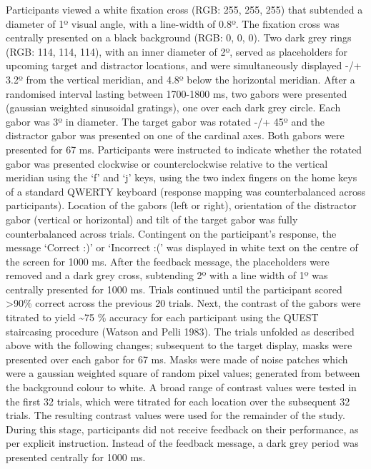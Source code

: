 \documentclass[11pt,halfline,a4paper,]{ouparticle}
\begin{document}
Participants viewed a white fixation cross (RGB: 255, 255, 255) that subtended a diameter of 1º visual angle, with a line-width of 0.8º. The fixation cross was centrally presented on a black background (RGB: 0, 0, 0). Two dark grey rings (RGB: 114, 114, 114), with an inner diameter of 2º, served as placeholders for upcoming target and distractor locations, and were simultaneously displayed -/+ 3.2º from the vertical meridian, and 4.8º below the horizontal meridian. After a randomised interval lasting between 1700-1800 ms, two gabors were presented (gaussian weighted sinusoidal gratings), one over each dark grey circle. Each gabor was 3º in diameter. The target gabor was rotated -/+ 45º and the distractor gabor was presented on one of the cardinal axes. Both gabors were presented for 67 ms. Participants were instructed to indicate whether the rotated gabor was presented clockwise or counterclockwise relative to the vertical meridian using the `f' and `j' keys, using the two index fingers on the home keys of a standard QWERTY keyboard (response mapping was counterbalanced across participants). Location of the gabors (left or right), orientation of the distractor gabor (vertical or horizontal) and tilt of the target gabor was fully counterbalanced across trials. Contingent on the participant's response, the message `Correct :)' or `Incorrect :(' was displayed in white text on the centre of the screen for 1000 ms. After the feedback message, the placeholders were removed and a dark grey cross, subtending 2º with a line width of 1º was centrally presented for 1000 ms. Trials continued until the participant scored \textgreater90\% correct across the previous 20 trials. Next, the contrast of the gabors were titrated to yield \textasciitilde75 \% accuracy for each participant using the QUEST staircasing procedure (Watson and Pelli 1983). The trials unfolded as described above with the following changes; subsequent to the target display, masks were presented over each gabor for 67 ms. Masks were made of noise patches which were a gaussian weighted square of random pixel values; generated from between the background colour to white. A broad range of contrast values were tested in the first 32 trials, which were titrated for each location over the subsequent 32 trials. The resulting contrast values were used for the remainder of the study. During this stage, participants did not receive feedback on their performance, as per explicit instruction. Instead of the feedback message, a dark grey period was presented centrally for 1000 ms.
\end{document}
